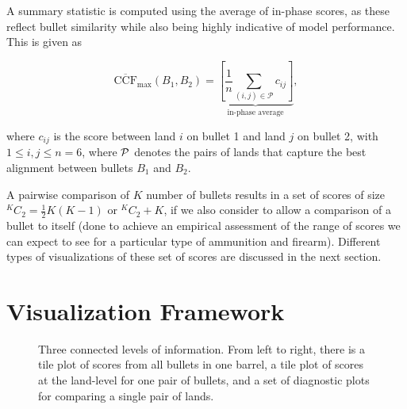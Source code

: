 \documentclass[
  12pt]{article}
\begin{document}
A summary statistic is computed using the average of in-phase scores, as
these reflect bullet similarity while also being highly indicative of
model performance. This is given as

\[
\mathrm{\overline{CCF}_{max}}(B_1, B_2) = \underbrace{\left[  \frac{1}{n} \sum_{(i,j) \in \mathcal{P}} c_{ij}\right]}_{\text{in-phase average}},
\]

where \(c_{ij}\) is the score between land \(i\) on bullet 1 and land
\(j\) on bullet 2, with \(1 \le i, j \le n=6\), where \({\cal P}\)
denotes the pairs of lands that capture the best alignment between
bullets \(B_1\) and \(B_2\).

A pairwise comparison of \(K\) number of bullets results in a set of
scores of size \(^KC_2 = \frac{1}{2}K(K-1)\) or \(^KC_2 + K\), if we
also consider to allow a comparison of a bullet to itself (done to
achieve an empirical assessment of the range of scores we can expect to
see for a particular type of ammunition and firearm). Different types of
visualizations of these set of scores are discussed in the next section.

\section{Visualization Framework}\label{sec-visuals}

\begin{figure}[H]


\caption{\label{fig-tool-pipeline}Three connected levels of information.
From left to right, there is a tile plot of scores from all bullets in
one barrel, a tile plot of scores at the land-level for one pair of
bullets, and a set of diagnostic plots for comparing a single pair of
lands.}

\end{figure}%
\end{document}
